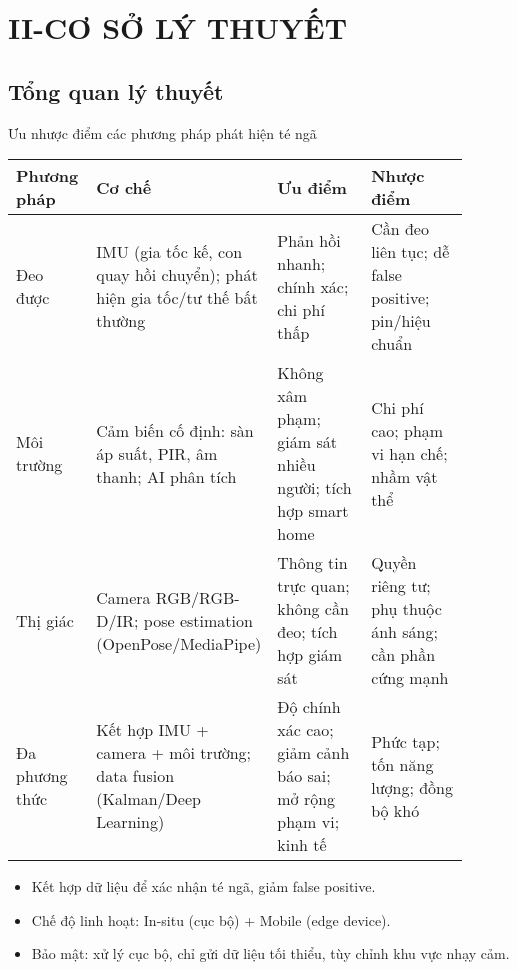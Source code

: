 \section{II-CƠ SỞ LÝ THUYẾT}
\subsection{Tổng quan lý thuyết}
\begin{frame}{Ưu nhược điểm các phương pháp phát hiện té ngã}
\scriptsize
\begin{tabular}{|p{0.18\linewidth}|p{0.22\linewidth}|p{0.25\linewidth}|p{0.25\linewidth}|}
\hline
\textbf{Phương pháp} & \textbf{Cơ chế} & \textbf{Ưu điểm} & \textbf{Nhược điểm} \\
\hline
Đeo được & IMU (gia tốc kế, con quay hồi chuyển); phát hiện gia tốc/tư thế bất thường & Phản hồi nhanh; chính xác; chi phí thấp & Cần đeo liên tục; dễ false positive; pin/hiệu chuẩn \\
\hline
Môi trường & Cảm biến cố định: sàn áp suất, PIR, âm thanh; AI phân tích & Không xâm phạm; giám sát nhiều người; tích hợp smart home & Chi phí cao; phạm vi hạn chế; nhầm vật thể \\
\hline
Thị giác & Camera RGB/RGB-D/IR; pose estimation (OpenPose/MediaPipe) & Thông tin trực quan; không cần đeo; tích hợp giám sát & Quyền riêng tư; phụ thuộc ánh sáng; cần phần cứng mạnh \\
\hline
Đa phương thức & Kết hợp IMU + camera + môi trường; data fusion (Kalman/Deep Learning) & Độ chính xác cao; giảm cảnh báo sai; mở rộng phạm vi; kinh tế & Phức tạp; tốn năng lượng; đồng bộ khó \\
\hline
\end{tabular}

\vspace{0.3em}
\begin{itemize}\scriptsize
    \item Kết hợp dữ liệu để xác nhận té ngã, giảm false positive.  
    \item Chế độ linh hoạt: In-situ (cục bộ) + Mobile (edge device).  
    \item Bảo mật: xử lý cục bộ, chỉ gửi dữ liệu tối thiểu, tùy chỉnh khu vực nhạy cảm.
\end{itemize}
\end{frame}

